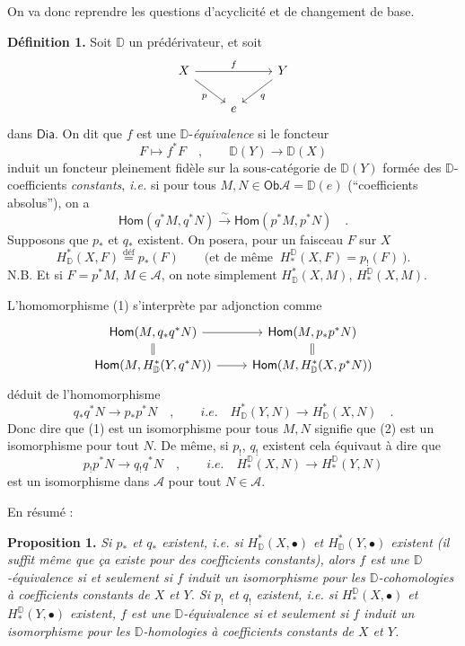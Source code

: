 \documentclass[11pt,leqno]{article}
\newcommand{\printedpage}[1]{\marginpar{\footnotesize p.~#1}}
\newcommand{\msp}[1]{\marginpar{\footnotesize [#1]}}
\newcommand{\DD}{\mathbb{D}}
\newcommand{\cA}{\mathcal{A}}
\newcommand{\Dia}{\mathsf{Dia}}
\newcommand{\Ob}{\mathsf{Ob}}
\newcommand{\isolongto}{\overset{\sim}{\longrightarrow}}
\newcommand{\sHom}{\mathsf{Hom}}
\begin{document}
On va donc reprendre les questions d'acyclicité et de changement de base.

\noindent\textbf{Définition 1.} Soit $\DD$ un prédérivateur, et soit
\[
\begin{tikzcd}
X \arrow[rr, "f"] \arrow[dr, "p"'] & & Y \arrow[dl, "q"] \\
& e &
\end{tikzcd}
\]
dans $\Dia$. On dit que $f$ est une $\DD$-\textit{équivalence} si le foncteur
\[
F \longmapsto f^*F \quad , \qquad \DD(Y) \longrightarrow \DD(X)
\]
induit un foncteur pleinement fidèle sur la sous-catégorie de $\DD(Y)$ formée des $\DD$-coefficients \textit{constants}, \textit{i.e.} si pour tous $M, N \in \Ob \cA = \DD(e)$ (“coefficients absolus”), on a
\[
\sHom(q^*M, q^*N) \isolongto \sHom(p^*M, p^*N) \quad . \tag*{(1)}
\]
Supposons que $p_*$ et $q_*$ existent. On posera, pour un faisceau $F$ sur $X$
\[
H^*_{\DD}(X, F) \overset{\text{déf}}{=} p_*(F) \qquad \text{(et de même } \ H^{\DD}_*(X, F) = p_!(F) \ \text{).}
\]
N.B. Et si $F = p^*M$, $M \in \cA$, on note simplement $H^*_{\DD}(X, M)$, $H^{\DD}_*(X, M)$.

\noindent L'homomorphisme (1) s'interprète par adjonction comme
\[
\begin{tikzcd}[row sep=small]
\sHom(M, q_*q^*N) \arrow[r] \arrow[d, equal] & \sHom(M, p_*p^*N) \arrow[d, equal] \\
\sHom(M, H^*_{\DD}(Y, q^*N)) \arrow[r] & \sHom(M, H^*_{\DD}(X, p^*N))
\end{tikzcd}
\]
déduit de l'homomorphisme
\[
q_*q^*N \longrightarrow p_*p^*N \quad , \qquad \textit{i.e.} \quad H^*_{\DD}(Y, N) \longrightarrow H^*_{\DD}(X, N) \quad . \tag*{(2)}
\]
Donc dire que (1) est un isomorphisme pour tous $M, N$ signifie que (2) est un isomorphisme pour tout $N$. De même, si $p_!$, $q_!$ existent cela équivaut à dire que
\[
p_!p^*N \longrightarrow q_!q^*N \quad , \qquad \textit{i.e.} \quad H^{\DD}_*(X, N) \longrightarrow H^{\DD}_*(Y, N) \tag*{$(2')$}
\]
est un isomorphisme dans $\cA$ pour tout $N \in \cA$.

\clearpage
\printedpage{36}
\noindent\msp{page 62}

\noindent En résumé :

\noindent\textbf{Proposition 1.} \textit{Si $p_*$ et $q_*$ existent, i.e. si $H^*_{\DD}(X, \bullet)$ et $H^*_{\DD}(Y, \bullet)$ existent (il suffit même que ça existe pour des coefficients constants), alors $f$ est une $\DD$-équivalence si et seulement si $f$ induit un isomorphisme pour les $\DD$-cohomologies à coefficients constants de $X$ et $Y$. Si $p_!$ et $q_!$ existent, i.e. si $H^{\DD}_*(X, \bullet)$ et $H^{\DD}_*(Y, \bullet)$ existent, $f$ est une $\DD$-équivalence si et seulement si $f$ induit un isomorphisme pour les $\DD$-homologies à coefficients constants de $X$ et $Y$.}
\end{document}
